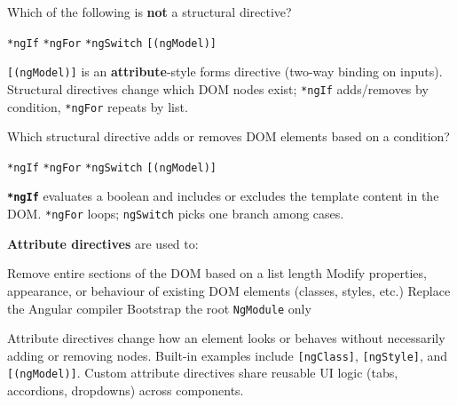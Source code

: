 \question[4]
Which of the following is \textbf{not} a structural directive?
\begin{choices}
  \choice \lstinline[style=htmlinline]|*ngIf|
  \choice \lstinline[style=htmlinline]|*ngFor|
  \choice \lstinline[style=htmlinline]|*ngSwitch|
  \CorrectChoice \lstinline[style=htmlinline]|[(ngModel)]|
\end{choices}
\begin{solution}
  \lstinline[style=htmlinline]|[(ngModel)]| is an \textbf{attribute}-style forms directive (two-way binding on inputs). Structural directives change which DOM nodes exist; \lstinline[style=htmlinline]|*ngIf| adds/removes by condition, \lstinline[style=htmlinline]|*ngFor| repeats by list.
\end{solution}

\question[4]
Which structural directive adds or removes DOM elements based on a condition?
\begin{choices}
  \CorrectChoice \lstinline[style=htmlinline]|*ngIf|
  \choice \lstinline[style=htmlinline]|*ngFor|
  \choice \lstinline[style=htmlinline]|*ngSwitch|
  \choice \lstinline[style=htmlinline]|[(ngModel)]|
\end{choices}
\begin{solution}
  \textbf{\lstinline[style=htmlinline]|*ngIf|} evaluates a boolean and includes or excludes the template content in the DOM. \lstinline[style=htmlinline]|*ngFor| loops; \lstinline[style=htmlinline]|ngSwitch| picks one branch among cases.
\end{solution}

\question[4]
\textbf{Attribute directives} are used to:
\begin{choices}
  \choice Remove entire sections of the DOM based on a list length
  \CorrectChoice Modify properties, appearance, or behaviour of existing DOM elements (classes, styles, etc.)
  \choice Replace the Angular compiler
  \choice Bootstrap the root \texttt{NgModule} only
\end{choices}
\begin{solution}
  Attribute directives change how an element looks or behaves without necessarily adding or removing nodes. Built-in examples include \lstinline[style=htmlinline]|[ngClass]|, \lstinline[style=htmlinline]|[ngStyle]|, and \lstinline[style=htmlinline]|[(ngModel)]|. Custom attribute directives share reusable UI logic (tabs, accordions, dropdowns) across components.
\end{solution}

